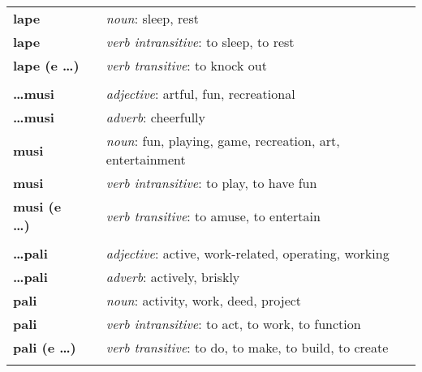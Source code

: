 \begin{supertabular}{p{2,5cm}|ll}
    \textbf{lape}           &  & \textit{noun}: sleep, rest                                                   \\ %
    \textbf{lape}           &  & \textit{verb intransitive}: to sleep, to rest                                \\ %
    \textbf{lape (e \dots)} &  & \textit{verb transitive}: to knock out                                       \\ %
                            &  &                                                                              \\ %
    \textbf{\dots musi}     &  & \textit{adjective}: artful, fun, recreational                                \\ %
    \textbf{\dots musi}     &  & \textit{adverb}: cheerfully                                                  \\ %
    \textbf{musi}           &  & \textit{noun}: fun, playing, game, recreation, art, entertainment            \\ %
    \textbf{musi}           &  & \textit{verb intransitive}: to play, to have fun                             \\ %
    \textbf{musi (e \dots)} &  & \textit{verb transitive}: to amuse, to entertain                             \\ %
                            &  &                                                                              \\ %
    \textbf{\dots pali}     &  & \textit{adjective}: active, work-related, operating, working                 \\ %
    \textbf{\dots pali}     &  & \textit{adverb}: actively, briskly                                           \\ %
    \textbf{pali}           &  & \textit{noun}: activity, work, deed, project                                 \\ %
    \textbf{pali}           &  & \textit{verb intransitive}: to act, to work, to function                     \\ %
    \textbf{pali (e \dots)} &  & \textit{verb transitive}: to do, to make, to build, to create                \\ %
                            &  &                                                                              \\ %

\end{supertabular}
